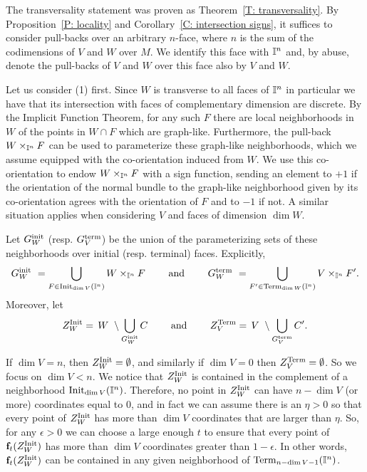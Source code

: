 The transversality statement was proven as Theorem~\ref{T: transversality}.
By Proposition~\ref{P: locality} and Corollary~\ref{C: intersection signs}, it suffices to consider pull-backs over an arbitrary $n$-face, where $n$ is the sum of the codimensions of $V$ and $W$ over $M$.
We identify this face with $\mathbb{I}^n$ and, by abuse, denote the pull-backs of $V$ and $W$ over this face also by $V$ and $W$.

Let us consider (1) first.
Since $W$ is transverse to all faces of $\mathbb{I}^n$ in particular we have that its intersection with faces of complementary dimension are discrete.
By the Implicit Function Theorem, for any such $F$ there are local neighborhoods in $W$ of the points in $W \cap F$ which are graph-like.
Furthermore, the pull-back $W \times_{\mathbb{I}^n} F$ can be used to parameterize these graph-like neighborhoods, which we assume equipped with the co-orientation induced from $W$.
We use this co-orientation to endow $W \times_{\mathbb{I}^n} F$ with a sign function,
sending an element to $+1$ if the orientation of the normal bundle to the graph-like neighborhood given by its co-orientation agrees
with the orientation of $F$ and to $-1$ if not.
A similar situation applies when considering $V$ and faces of dimension $\dim W$.

Let $G^{\mathrm{init}}_W$ (resp. $G^{\mathrm{term}}_V$) be the union of the parameterizing sets of these neighborhoods over initial (resp. terminal) faces. Explicitly,
\begin{equation*}
	G^{\mathrm{init}}_W\ =
	\bigcup_{F \in {\rm Init}_{\dim V}(\mathbb{I}^n)} W \times_{\mathbb{I}^n} F
	\qquad \text{ and } \qquad
	G^{\mathrm{term}}_W\ =
	\bigcup_{F^\prime \in {\rm Term}_{\dim W}(\mathbb{I}^n)} V \times_{\mathbb{I}^n} F^\prime.
\end{equation*}
Moreover, let
\begin{equation*}
	Z_W^{\rm Init} =\, W\ \setminus \bigcup_{G^{\mathrm{init}}_W} C
	\qquad \text{ and } \qquad
	Z_V^{\rm Term} =\, V\ \setminus \bigcup_{G^{\mathrm{term}}_V} C^\prime.
\end{equation*}

If $\dim V=n$, then $Z_W^{\rm Init}=\emptyset$, and similarly if $\dim V=0$ then $Z_V^{\rm Term}=\emptyset$.
So we focus on $\dim V<n$.
We notice that $Z_W^{\rm Init}$ is contained in the complement of a neighborhood ${\rm Init}_{\dim V}(\mathbb{I}^n)$.
Therefore, no point in $Z_W^{\rm Init}$ can have $n-\dim V$ (or more) coordinates equal to $0$, and in fact we can assume there is an $\eta>0$
so that every point of $Z_W^{\rm Init}$ has more than $\dim V$ coordinates that are larger than $\eta$.
So, for any $\epsilon>0$ we can choose a large enough $t$ to ensure that every point of $\mathbf{f}_t(Z_W^{\rm Init})$ has more than $\dim V$ coordinates greater than
$1-\epsilon$. In other words, $\mathbf{f}_t(Z_W^{\rm Init})$ can be contained in any given neighborhood of ${\rm Term}_{n-\dim V-1}(\mathbb{I}^n)$.

